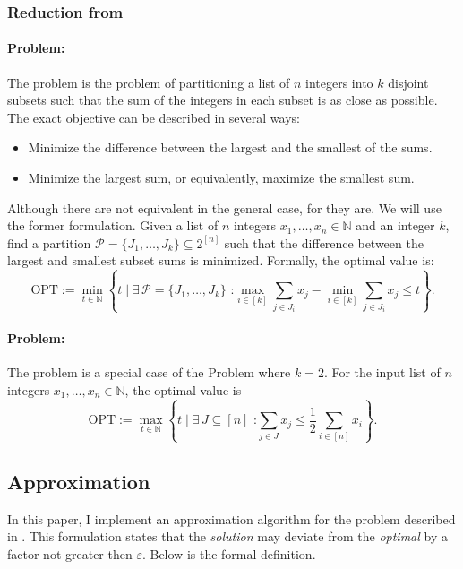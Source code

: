 \subsubsection{Reduction from \MultPart}
\paragraph{\MultPart Problem:}
The \MultPart problem is the problem of partitioning a list of \(n\) integers into \(k\) disjoint subsets such that the sum of the integers in each subset is as close as possible. The exact objective can be described in several ways:
\begin{itemize}
    \item Minimize the difference between the largest and the smallest of the sums.
    \item Minimize the largest sum, or equivalently, maximize the smallest sum.
\end{itemize}
Although there are not equivalent in the general case, for \Partition they are. We will use the former formulation.
Given a list of \(n\) integers \(x_1, \ldots, x_n \in \mathbb{N}\) and an integer \(k\), find a partition \(\mathcal{P} = \{J_1, \ldots, J_k\} \subseteq 2^{[n]}\) such that the difference between the largest and smallest subset sums is minimized. Formally, the optimal value is:
\[
\text{OPT} := \min_{t \in \mathbb{N}} \left\{ t \mid \exists \, \mathcal{P} = \{J_1, \ldots, J_k\} \text{ :} \max_{i \in [k]} \sum_{j \in J_i} x_j - \min_{i \in [k]} \sum_{j \in J_i} x_j \leq t \right\}.
\]
\paragraph{\Partition Problem:}
The \Partition problem is a special case of the \MultPart Problem where \(k = 2\). For the input list of \(n\) integers \(x_1, \ldots, x_n \in \mathbb{N}\), the optimal value is
\[
    \text{OPT} := \max_{t \in \mathbb{N}} \left\{ t \mid \exists \, J \subseteq [n] \text{ :} \sum_{j \in J} x_j \le \frac{1}{2} \sum_{i \in [n]} x_i \right\}.
\]

\subsection{Approximation}
In this paper, I implement an approximation algorithm for the \Partition problem described in \cite{deng}. This formulation states that the \textit{solution} may deviate from the \textit{optimal} by a factor not greater then \(\varepsilon\). Below is the formal definition.
